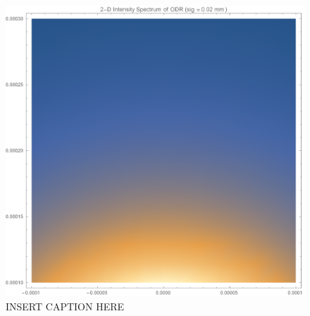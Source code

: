 \documentclass[12pt]{article}
\begin{document}
\begin{figure}
\begin{center}
\includegraphics[scale=0.5]{figures/ODR_2D_Intensity.PDF}
\caption{INSERT CAPTION HERE}
\end{center}
\end{figure}
\end{document}
